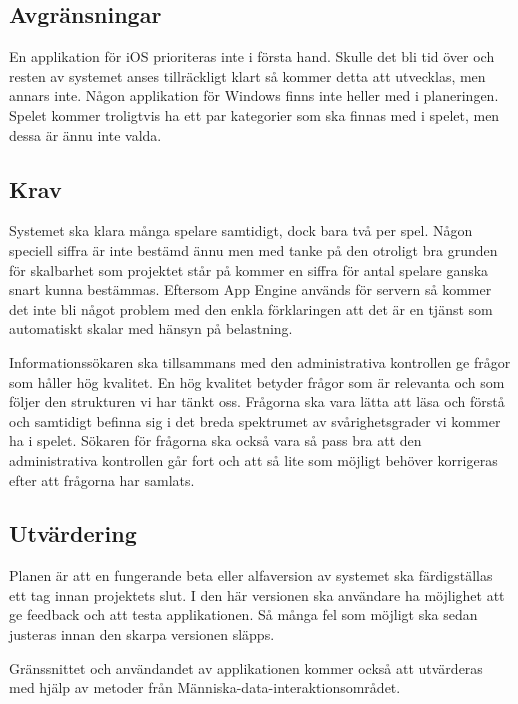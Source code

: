 \documentclass[12pt,a4paper]{article}
\begin{document}
\subsection{Avgränsningar}
En applikation för iOS prioriteras inte i första hand. Skulle det bli tid över och resten av systemet anses tillräckligt klart så kommer detta att utvecklas, men annars inte. Någon applikation för Windows finns inte heller med i planeringen. Spelet kommer troligtvis ha ett par kategorier som ska finnas med i spelet, men dessa är ännu inte valda.

\subsection{Krav}
Systemet ska klara många spelare samtidigt, dock bara två per spel. Någon speciell siffra är inte bestämd ännu men med tanke på den otroligt bra grunden för skalbarhet som projektet står på kommer en siffra för antal spelare ganska snart kunna bestämmas. Eftersom App Engine används för servern så kommer det inte bli något problem med den enkla förklaringen att det är en tjänst som automatiskt skalar med hänsyn på belastning. \cite{appenginescalability}

Informationssökaren ska tillsammans med den administrativa kontrollen ge frågor som håller hög kvalitet. En hög kvalitet betyder frågor som är relevanta och som följer den strukturen vi har tänkt oss. Frågorna ska vara lätta att läsa och förstå och samtidigt befinna sig i det breda spektrumet av svårighetsgrader vi kommer ha i spelet. Sökaren för frågorna ska också vara så pass bra att den administrativa kontrollen går fort och att så lite som möjligt behöver korrigeras efter att frågorna har samlats.

\subsection{Utvärdering}
Planen är att en fungerande beta eller alfaversion av systemet ska färdigställas ett tag innan projektets slut. I den här versionen ska användare ha möjlighet att ge feedback och att testa applikationen. Så många fel som möjligt ska sedan justeras innan den skarpa versionen släpps.

Gränssnittet och användandet av applikationen kommer också att utvärderas med hjälp av metoder från Människa-data-interaktionsområdet.
\appendix
\end{document}

